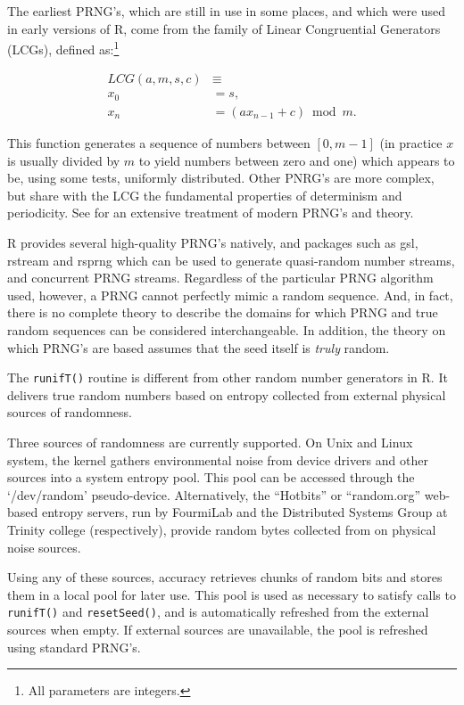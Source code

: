 \documentclass[11pt]{article}
\let\code=\texttt
\let\proglang=\textsf
\newcommand{\pkg}[1]{{\normalfont\fontseries{b}\selectfont #1}}
\begin{document}
The earliest PRNG's, which are still in use in some places, and which were used in early versions of R, come 
from the family of Linear Congruential Generators (LCGs), defined 
	as:\footnote{All parameters are integers.}

\begin{align}\label{Congruential.Generator}
    LCG(a,m,s,c)&\equiv \nonumber\\
            x_{0} &=s,  \nonumber\\
            x_{n} &=(ax_{n-1}+c)\bmod{m}.
\end{align} 

This function generates a sequence of numbers between $[0,m-1]$ (in practice $x$ is usually divided by $m$ to yield numbers between zero and one) which appears to be, using some tests, uniformly distributed. Other PNRG's are more complex, but share with the LCG the fundamental properties of determinism and periodicity. See \cite{Gentle98} for an extensive treatment of modern PRNG's and theory.

\proglang{R} provides several high-quality PRNG's natively, and packages such as 
\pkg{gsl}, \pkg{rstream} and \pkg{rsprng} which can be used to generate
quasi-random number streams, and concurrent PRNG streams.
Regardless of the particular PRNG algorithm used, however, a PRNG cannot
perfectly mimic a random sequence. And, in fact, there is no complete
theory to describe the domains for which PRNG and true random sequences 
can be considered interchangeable. In addition, the theory
on which PRNG's are based assumes that the seed itself is \emph{truly} random.

The \code{runifT()} routine is different from other random number generators in R. 
It delivers true random numbers based on
entropy collected from external physical sources of randomness.

Three sources of randomness are currently supported. On Unix and Linux system, the kernel gathers environmental noise from 
device drivers and other sources into a system entropy pool.
This pool can be accessed through the `/dev/random' pseudo-device.
Alternatively, the ``Hotbits'' or ``random.org'' web-based
entropy servers, run by FourmiLab and the Distributed Systems Group
at Trinity college (respectively), provide random bytes collected from on physical noise sources.

Using any of these sources, \pkg{accuracy} retrieves chunks of random bits and stores them in a local pool for later use. This pool is used as necessary to 
 satisfy calls to \code{runifT()} and \code{resetSeed()},
 and is automatically refreshed from the external sources when empty. 
 If external sources are unavailable, the pool is refreshed using standard PRNG's.
\end{document}
